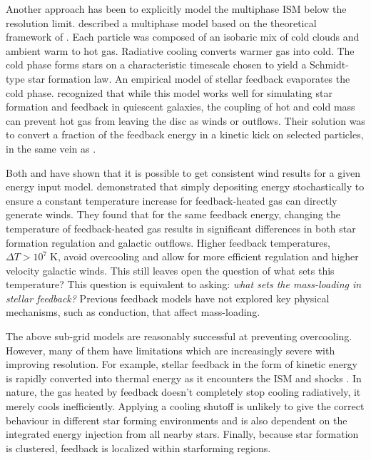 Another approach has been to explicitly model the multiphase ISM
below the resolution limit.  \citet{Springel2003} described a multiphase
model based on the theoretical framework of \citet{McKee1977}.  Each
particle was composed of an isobaric mix of cold clouds and ambient warm
to hot gas.  Radiative cooling converts warmer gas into cold.  The cold
phase forms stars on a characteristic timescale chosen to yield a
Schmidt-type star formation law.  An empirical model of stellar feedback
evaporates the cold phase.  \citet{Springel2003} recognized that while
this model works well for simulating star formation and feedback in
quiescent galaxies, the coupling of hot and cold mass can prevent hot
gas from leaving the disc as winds or outflows.  Their solution was to
convert a fraction of the feedback energy in a kinetic kick on selected
particles, in the same vein as \citet{Mihos1994}.  

Both \citet{DallaVecchia2012} and \cite{Hopkins2012b} have shown
that it is possible to get consistent wind results for a given energy input model.   
\citet{DallaVecchia2012} demonstrated that simply depositing 
 energy stochastically to ensure a constant temperature increase for 
feedback-heated gas can directly generate winds.    
They found that for the same feedback energy,
changing the temperature of feedback-heated gas results in significant
differences in both star formation regulation and galactic outflows.  Higher
feedback temperatures, $\Delta T > 10^7\;\mathrm{K}$, avoid overcooling and
allow for more efficient regulation and higher velocity galactic winds.  
This still leaves open the question of what sets this temperature?  
This question is equivalent to asking: {\it what sets the mass-loading in stellar
feedback?}   Previous feedback models have not explored key
physical mechanisms, such as conduction, that affect mass-loading.

The above sub-grid models are reasonably successful at preventing
overcooling.  However, many of them have limitations which are
increasingly severe with improving resolution.  For example, stellar feedback
in the form of kinetic energy is rapidly converted into thermal energy as it
encounters the ISM and shocks \citep{Durier2012}.  In nature,
the gas heated by feedback doesn't completely stop cooling radiatively, it
merely cools inefficiently.  Applying a cooling shutoff is unlikely to give the
correct behaviour in different star forming environments and is also dependent
on the integrated energy injection from all nearby stars.  Finally, because
star formation is clustered, feedback is localized within starforming regions. 

